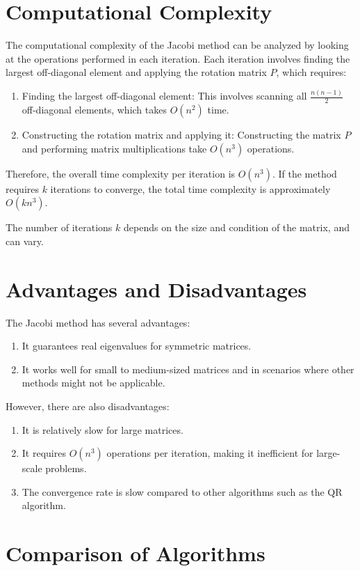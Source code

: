 \documentclass[journal]{IEEEtran}
\begin{document}
\section{Computational Complexity}

The computational complexity of the Jacobi method can be analyzed by looking at the operations performed in each iteration. Each iteration involves finding the largest off-diagonal element and applying the rotation matrix $P$, which requires:
\begin{enumerate}
 \item Finding the largest off-diagonal element: This involves scanning all $\frac{n(n-1)}{2}$ off-diagonal elements, which takes $O(n^2)$ time.
 \item Constructing the rotation matrix and applying it: Constructing the matrix $P$ and performing matrix multiplications take $O(n^3)$ operations.
\end{enumerate}
Therefore, the overall time complexity per iteration is $O(n^3)$. If the method requires $k$ iterations to converge, the total time complexity is approximately $O(kn^3)$.

The number of iterations $k$ depends on the size and condition of the matrix, and can vary.

\section{Advantages and Disadvantages}

The Jacobi method has several advantages:
\begin{enumerate}
    \item It guarantees real eigenvalues for symmetric matrices.
    \item It works well for small to medium-sized matrices and in scenarios where other methods might not be applicable.
\end{enumerate}

However, there are also disadvantages:
\begin{enumerate}
    \item It is relatively slow for large matrices.
    \item It requires $O(n^3)$ operations per iteration, making it inefficient for large-scale problems.
    \item The convergence rate is slow compared to other algorithms such as the QR algorithm.
\end{enumerate}


\section{Comparison of Algorithms}
\end{document}
